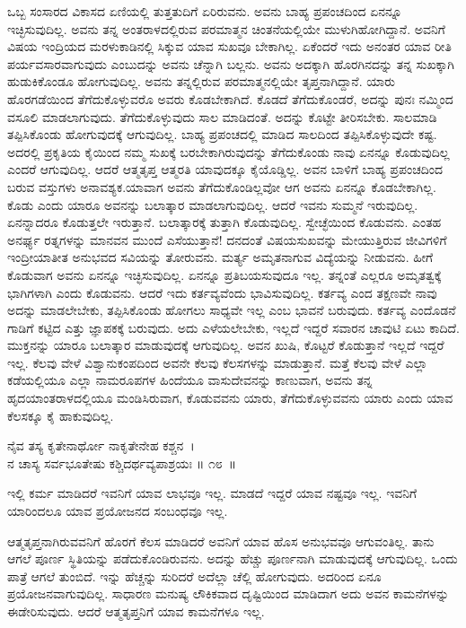 ಒಬ್ಬ ಸಂಸಾರದ ವಿಕಾಸದ ಏಣಿಯಲ್ಲಿ ತುತ್ತತುದಿಗೆ ಏರಿರುವನು. ಅವನು ಬಾಹ್ಯ ಪ್ರಪಂಚದಿಂದ ಏನನ್ನೂ ಇಚ್ಛಿಸುವುದಿಲ್ಲ. ಅವನು ತನ್ನ ಅಂತರಾಳದಲ್ಲಿರುವ ಪರಮಾತ್ಮನ ಚಿಂತನೆಯಲ್ಲಿಯೇ ಮುಳುಗಿಹೋಗಿದ್ದಾನೆ. ಅವನಿಗೆ ವಿಷಯ ಇಂದ್ರಿಯದ ಮರಳುಕಾಡಿನಲ್ಲಿ ಸಿಕ್ಕುವ ಯಾವ ಸುಖವೂ ಬೇಕಾಗಿಲ್ಲ. ಏಕೆಂದರೆ ಇದು ಅನಂತರ ಯಾವ ರೀತಿ ಪರ್ಯವಸಾರವಾಗುವುದು ಎಂಬುದನ್ನು ಅವನು ಚೆನ್ನಾಗಿ ಬಲ್ಲನು. ಅವನು ಅದಕ್ಕಾಗಿ ಹೊರಗಿನದನ್ನು ತನ್ನ ಸುಖಕ್ಕಾಗಿ ಹುಡುಕಿಕೊಂಡೂ ಹೋಗುವುದಿಲ್ಲ. ಅವನು ತನ್ನಲ್ಲಿರುವ ಪರಮಾತ್ಮನಲ್ಲಿಯೇ ತೃಪ್ತನಾಗಿದ್ದಾನೆ. ಯಾರು ಹೊರಗಡೆಯಿಂದ ತೆಗೆದುಕೊಳ್ಳುವರೊ ಅವರು ಕೊಡಬೇಕಾಗಿದೆ. ಕೊಡದೆ ತೆಗೆದುಕೊಂಡರೆ, ಅದನ್ನು ಪುನಃ ನಮ್ಮಿಂದ ವಸೂಲಿ ಮಾಡಲಾಗುವುದು. ತೆಗೆದುಕೊಳ್ಳುವುದು ಸಾಲ ಮಾಡಿದಂತೆ. ಅದನ್ನು ಕೊಟ್ಟೇ ತೀರಿಸಬೇಕು. ಸಾಲಮಾಡಿ ತಪ್ಪಿಸಿಕೊಂಡು ಹೋಗುವುದಕ್ಕೆ ಆಗುವುದಿಲ್ಲ. ಬಾಹ್ಯ ಪ್ರಪಂಚದಲ್ಲಿ ಮಾಡಿದ ಸಾಲದಿಂದ ತಪ್ಪಿಸಿಕೊಳ್ಳುವುದೇ ಕಷ್ಟ. ಅದರಲ್ಲಿ ಪ್ರಕೃತಿಯ ಕೈಯಿಂದ ನಮ್ಮ ಸುಖಕ್ಕೆ ಬರಬೇಕಾಗಿರುವುದನ್ನು ತೆಗೆದುಕೊಂಡು ನಾವು ಏನನ್ನೂ ಕೊಡುವುದಿಲ್ಲ ಎಂದರೆ ಆಗುವುದಿಲ್ಲ. ಆದರೆ ಆತ್ಮತೃಪ್ತ ಆತ್ಮರತಿ ಯಾವುದಕ್ಕೂ ಕೈಯೊಡ್ಡಿಲ್ಲ. ಅವನ ಬಾಳಿಗೆ ಬಾಹ್ಯ ಪ್ರಪಂಚದಿಂದ ಬರುವ ವಸ್ತುಗಳು ಅನಾವಶ್ಯಕ.\break ಯಾವಾಗ ಅವನು ತೆಗೆದುಕೊಂಡಿಲ್ಲವೋ ಆಗ ಅವನು ಏನನ್ನೂ ಕೊಡಬೇಕಾಗಿಲ್ಲ. ಕೊಡು ಎಂದು ಯಾರೂ ಅವನನ್ನು ಬಲಾತ್ಕಾರ ಮಾಡಲಾಗುವುದಿಲ್ಲ. ಆದರೆ ಇವನು ಸುಮ್ಮನೆ ಇರುವುದಿಲ್ಲ. ಏನನ್ನಾದರೂ ಕೊಡುತ್ತಲೇ ಇರುತ್ತಾನೆ. ಬಲಾತ್ಕಾರಕ್ಕೆ ತುತ್ತಾಗಿ ಕೊಡುವುದಿಲ್ಲ. ಸ್ವೇಚ್ಛೆಯಿಂದ ಕೊಡುವನು. ಎಂತಹ ಅನರ್ಘ್ಯ ರತ್ನಗಳನ್ನು ಮಾನವನ ಮುಂದೆ ಎಸೆಯುತ್ತಾನೆ! ದನದಂತೆ ವಿಷಯಸುಖವನ್ನು ಮೇಯುತ್ತಿರುವ ಜೀವಿಗಳಿಗೆ ಇಂದ್ರೀಯಾತೀತ ಅನುಭವದ ಸವಿಯನ್ನು ತೋರುವನು. ಮರ್ತ್ಯ ಅಮೃತನಾಗುವ ವಿದ್ಯೆಯನ್ನು ನೀಡುವನು. ಹೀಗೆ ಕೊಡುವಾಗ ಅವನು ಏನನ್ನೂ ಇಚ್ಛಿಸುವುದಿಲ್ಲ. ಏನನ್ನೂ ಪ್ರತಿಬಯಸುವುದೂ ಇಲ್ಲ. ತನ್ನಂತೆ ಎಲ್ಲರೂ ಅಮೃತತ್ವಕ್ಕೆ ಭಾಗಿಗಳಾಗಿ ಎಂದು ಕೊಡುವನು. ಆದರೆ ಇದು ಕರ್ತವ್ಯವೆಂದು ಭಾವಿಸುವುದಿಲ್ಲ. ಕರ್ತವ್ಯ ಎಂದ ತಕ್ಷಣವೇ ನಾವು ಅದನ್ನು ಮಾಡಲೇಬೇಕು, ತಪ್ಪಿಸಿಕೊಂಡು ಹೋಗಲು ಸಾಧ್ಯವೇ ಇಲ್ಲ ಎಂಬ ಭಾವನೆ ಬರುವುದು. ಕರ್ತವ್ಯ ಎಂದೊಡನೆ ಗಾಡಿಗೆ ಕಟ್ಟಿದ ಎತ್ತು ಜ್ಞಾಪಕಕ್ಕೆ ಬರುವುದು. ಅದು ಎಳೆಯಲೇಬೇಕು, ಇಲ್ಲದೆ ಇದ್ದರೆ ಸವಾರನ ಚಾವುಟಿ ಏಟು ಕಾದಿದೆ. ಮುಕ್ತನನ್ನು ಯಾರೂ ಬಲಾತ್ಕಾರ ಮಾಡುವುದಕ್ಕೆ ಆಗುವುದಿಲ್ಲ. ಅವನ ಖುಷಿ, ಕೊಟ್ಟರೆ ಕೊಡುತ್ತಾನೆ ಇಲ್ಲದೆ ಇದ್ದರೆ ಇಲ್ಲ. ಕೆಲವು ವೇಳೆ ವಿಶ್ವಾನುಕಂಪದಿಂದ ಅವನೇ ಕೆಲವು ಕೆಲಸಗಳನ್ನು ಮಾಡುತ್ತಾನೆ. ಮತ್ತೆ ಕೆಲವು ವೇಳೆ ಎಲ್ಲಾ ಕಡೆಯಲ್ಲಿಯೂ ಎಲ್ಲಾ ನಾಮರೂಪಗಳ ಹಿಂದೆಯೂ ವಾಸುದೇವನನ್ನು ಕಾಣುವಾಗ, ಅವನು ತನ್ನ ಹೃದಯಾಂತರಾಳದಲ್ಲಿಯೂ ಮಂಡಿಸಿರುವಾಗ, ಕೊಡುವವನು ಯಾರು, ತೆಗೆದುಕೊಳ್ಳುವವನು ಯಾರು ಎಂದು ಯಾವ ಕೆಲಸಕ್ಕೂ ಕೈ ಹಾಕುವುದಿಲ್ಲ.

\begin{shloka}
ನೈವ ತಸ್ಯ ಕೃತೇನಾರ್ಥೋ ನಾಕೃತೇನೇಹ ಕಶ್ಚನ~।\\ನ ಚಾಸ್ಯ ಸರ್ವಭೂತೇಷು ಕಶ್ಚಿದರ್ಥವ್ಯಪಾಶ್ರಯಃ \hfill॥ ೧೮~॥
\end{shloka}

\begin{artha}
ಇಲ್ಲಿ ಕರ್ಮ ಮಾಡಿದರೆ ಇವನಿಗೆ ಯಾವ ಲಾಭವೂ ಇಲ್ಲ. ಮಾಡದೆ ಇದ್ದರೆ ಯಾವ ನಷ್ಟವೂ ಇಲ್ಲ. ಇವನಿಗೆ ಯಾರಿಂದಲೂ ಯಾವ ಪ್ರಯೋಜನದ ಸಂಬಂಧವೂ ಇಲ್ಲ.
\end{artha}

ಆತ್ಮತೃಪ್ತನಾಗಿರುವವನಿಗೆ ಹೊರಗೆ ಕೆಲಸ ಮಾಡಿದರೆ ಅವನಿಗೆ ಯಾವ ಹೊಸ ಅನುಭವವೂ ಆಗುವಂತಿಲ್ಲ. ತಾನು ಆಗಲೆ ಪೂರ್ಣ ಸ್ಥಿತಿಯನ್ನು ಪಡೆದುಕೊಂಡಿರುವನು. ಅದನ್ನು ಹೆಚ್ಚು ಪೂರ್ಣನಾಗಿ ಮಾಡುವುದಕ್ಕೆ ಆಗುವುದಿಲ್ಲ. ಒಂದು ಪಾತ್ರೆ ಆಗಲೆ ತುಂಬಿದೆ. ಇನ್ನು ಹೆಚ್ಚನ್ನು ಸುರಿದರೆ ಅದೆಲ್ಲಾ ಚೆಲ್ಲಿ ಹೋಗುವುದು. ಅದರಿಂದ ಏನೂ ಪ್ರಯೋಜನವಾಗುವುದಿಲ್ಲ. ಸಾಧಾರಣ ಮನುಷ್ಯ ಲೌಕಿಕವಾದ ದೃಷ್ಟಿಯಿಂದ ಮಾಡಿದಾಗ ಅದು ಅವನ ಕಾಮನೆಗಳನ್ನು ಈಡೇರಿಸುವುದು. ಆದರೆ ಆತ್ಮತೃಪ್ತನಿಗೆ ಯಾವ ಕಾಮನೆಗಳೂ ಇಲ್ಲ.

